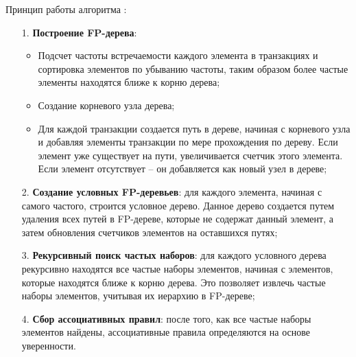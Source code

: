 Принцип работы алгоритма \cite{fpgrowth}:
\begin{enumerate}
	\item[1.] \textbf{Построение FP-дерева}:
		\begin{itemize}
			\item Подсчет частоты встречаемости каждого элемента в транзакциях и сортировка элементов по убыванию частоты, таким образом более частые элементы находятся ближе к корню дерева;
			\item Создание корневого узла дерева;
			\item Для каждой транзакции создается путь в дереве, начиная с корневого узла и добавляя элементы транзакции по мере прохождения по дереву. Если элемент уже существует на пути, увеличивается счетчик этого элемента. Если элемент отсутствует -- он добавляется как новый узел в дереве;
		\end{itemize}
	\item[2.] \textbf{Создание условных FP-деревьев}: для каждого элемента, начиная с самого частого, строится условное дерево. Данное дерево создается путем удаления всех путей в FP-дереве, которые не содержат данный элемент, а затем обновления счетчиков элементов на оставшихся путях;
	\item[3.] \textbf{Рекурсивный поиск частых наборов}: для каждого условного дерева рекурсивно находятся все частые наборы элементов, начиная с элементов, которые находятся ближе к корню дерева. Это позволяет извлечь частые наборы элементов, учитывая их иерархию в FP-дереве;
	\item[4.] \textbf{Сбор ассоциативных правил}: после того, как все частые наборы элементов найдены, ассоциативные правила определяются на основе уверенности.
\end{enumerate}
\pagebreak